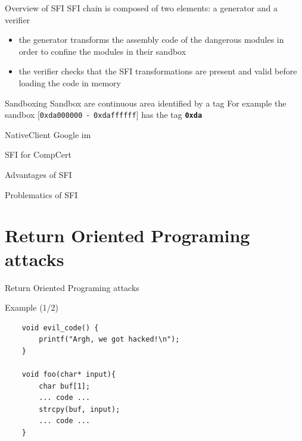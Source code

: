 \documentclass{beamer}
\begin{document}
\begin{frame}{Overview of SFI} %
	SFI chain is composed of two elements: a generator and a verifier
		\begin{itemize}
			\item the generator transforms the assembly code of the dangerous modules in order to confine the modules in their sandbox
			\item the verifier checks that the SFI transformations are present and valid before loading the code in memory
		\end{itemize}
\end{frame}

\begin{frame}{Sandboxing}
	Sandbox are continuous area identified by a tag
	For example the sandbox [\texttt{0xda000000}~-~\texttt{0xdaffffff}] has the tag \textbf{\texttt{0xda}}
\end{frame}

\begin{frame}[c]{NativeClient}
	Google im
\end{frame}

\begin{frame}[c]{SFI for CompCert}
\end{frame}

\begin{frame}{Advantages of SFI}
\end{frame}

\begin{frame}[c]{Problematics of SFI}
\end{frame}

\section{Return Oriented Programing attacks}
\label{sec:Return Oriented Programing attacks}

\begin{frame}[c]{Return Oriented Programing attacks}
\end{frame}

\begin{frame}[fragile]{Example (1/2)}
\begin{lstlisting}
	void evil_code() {
		printf("Argh, we got hacked!\n");
	}

	void foo(char* input){
		char buf[1];
		... code ...
		strcpy(buf, input);
		... code ...
	}
\end{lstlisting}

\end{frame}
\end{document}
